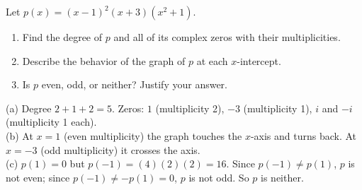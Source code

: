 \begin{exo}{}
Let $p(x)=(x-1)^2(x+3)(x^2+1)$.
\begin{enumerate}[label=(\alph*)]
\item Find the degree of $p$ and all of its complex zeros with their multiplicities.
\item Describe the behavior of the graph of $p$ at each $x$-intercept.
\item Is $p$ even, odd, or neither? Justify your answer.
\end{enumerate}
\begin{solution}
(a) Degree $2+1+2=5$. Zeros: $1$ (multiplicity 2), $-3$ (multiplicity 1), $i$ and $-i$ (multiplicity 1 each).\\
(b) At $x=1$ (even multiplicity) the graph touches the $x$-axis and turns back. At $x=-3$ (odd multiplicity) it crosses the axis.\\
(c) $p(1)=0$ but $p(-1)=(4)(2)(2)=16$. Since $p(-1)\neq p(1)$, $p$ is not even; since $p(-1)\neq-p(1)=0$, $p$ is not odd. So $p$ is neither.
\end{solution}
\end{exo}

